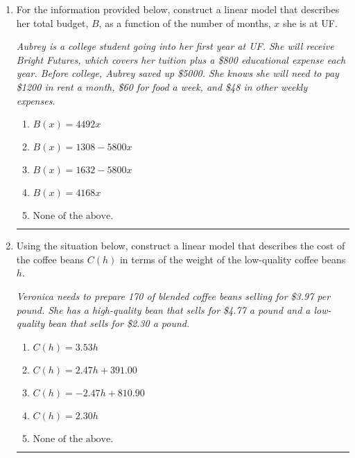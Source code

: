 \documentclass[14pt]{extbook}
\newcommand{\litem}[1]{\item#1\hspace*{-1cm}\rule{\textwidth}{0.4pt}}
\begin{document}
\begin{enumerate}
{\begin{enumerate}[label=\Alph*.]
\end{enumerate} }
\litem{
For the information provided below, construct a linear model that describes her total budget, $B$, as a function of the number of months, $x$ she is at UF.
\begin{center}
    \textit{ Aubrey is a college student going into her first year at UF. She will receive Bright Futures, which covers her tuition plus a \$800 educational expense each year. Before college, Aubrey saved up \$5000. She knows she will need to pay \$1200 in rent a month, \$60 for food a week, and \$48 in other weekly expenses. }
\end{center}
\begin{enumerate}[label=\Alph*.]
\item \( B(x) = 4492 x \)
\item \( B(x) = 1308 - 5800 x \)
\item \( B(x) = 1632 - 5800 x \)
\item \( B(x) = 4168 x \)
\item \( \text{None of the above.} \)

\end{enumerate} }
\litem{
Using the situation below, construct a linear model that describes the cost of the coffee beans $C(h)$ in terms of the weight of the low-quality coffee beans $h$.
\begin{center}
    \textit{ Veronica needs to prepare 170 of blended coffee beans selling for \$3.97 per pound. She has a high-quality bean that sells for \$4.77 a pound and a low-quality bean that sells for \$2.30 a pound. }
\end{center}
\begin{enumerate}[label=\Alph*.]
\item \( C(h) = 3.53 h \)
\item \( C(h) = 2.47 h + 391.00 \)
\item \( C(h) = -2.47 h + 810.90 \)
\item \( C(h) = 2.30 h \)
\item \( \text{None of the above.} \)


\end{enumerate}}
\end{enumerate}
\end{document}
